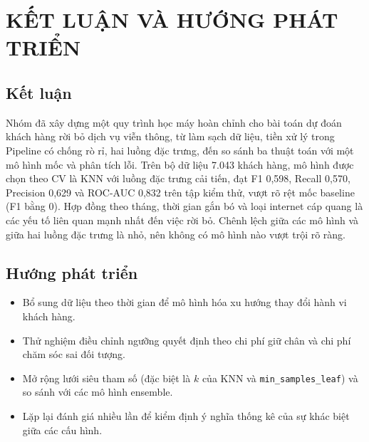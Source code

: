 \chapter*{KẾT LUẬN VÀ HƯỚNG PHÁT TRIỂN}

\section*{Kết luận}
Nhóm đã xây dựng một quy trình học máy hoàn chỉnh cho bài toán dự đoán khách hàng rời bỏ dịch vụ viễn thông, từ làm sạch dữ liệu,
tiền xử lý trong Pipeline có chống rò rỉ, hai luồng đặc trưng, đến so sánh ba thuật toán với một mô hình mốc và phân tích lỗi.
Trên bộ dữ liệu 7.043 khách hàng, mô hình được chọn theo CV là KNN với luồng đặc trưng cải tiến, đạt F1 0,598, Recall 0,570, Precision 0,629 và ROC-AUC 0,832 trên tập kiểm thử,
vượt rõ rệt mốc baseline (F1 bằng 0). Hợp đồng theo tháng, thời gian gắn bó và loại internet cáp quang là các yếu tố liên quan mạnh nhất đến việc rời bỏ.
Chênh lệch giữa các mô hình và giữa hai luồng đặc trưng là nhỏ, nên không có mô hình nào vượt trội rõ ràng.

\section*{Hướng phát triển}
\begin{itemize}
    \item Bổ sung dữ liệu theo thời gian để mô hình hóa xu hướng thay đổi hành vi khách hàng.
    \item Thử nghiệm điều chỉnh ngưỡng quyết định theo chi phí giữ chân và chi phí chăm sóc sai đối tượng.
    \item Mở rộng lưới siêu tham số (đặc biệt là $k$ của KNN và \texttt{min\_samples\_leaf}) và so sánh với các mô hình ensemble.
    \item Lặp lại đánh giá nhiều lần để kiểm định ý nghĩa thống kê của sự khác biệt giữa các cấu hình.
\end{itemize}
